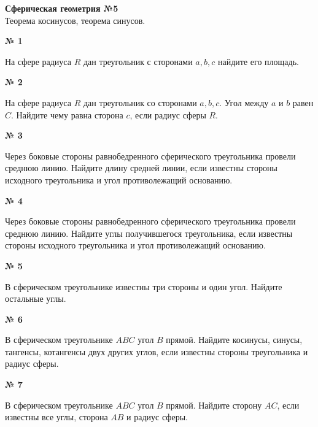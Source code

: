 


    \begin{center}
        \textbf{Сферическая геометрия №5}\\
        Теорема косинусов, теорема синусов.
    \end{center}

    \begin{center}
        \textbf{№ 1}
    \end{center}

    На сфере радиуса $R$ дан треугольник с сторонами $a, b, c$ найдите его площадь.

    \begin{center}
        \textbf{№ 2}
    \end{center}

    На сфере радиуса $R$ дан треугольник со сторонами $a, b, c$.
    Угол между $a$ и $b$ равен $C$.
    Найдите чему равна сторона $c$, если радиус сферы $R$.

    \begin{center}
        \textbf{№ 3}
    \end{center}

    Через боковые стороны равнобедренного сферического треугольника провели среднюю линию.
    Найдите длину средней линии, если известны стороны исходного треугольника и угол противолежащий основанию.


    \begin{center}
        \textbf{№ 4}
    \end{center}

    Через боковые стороны равнобедренного сферического треугольника провели среднюю линию.
    Найдите углы получившегося треугольника, если известны стороны исходного треугольника и угол противолежащий основанию.

    \begin{center}
        \textbf{№ 5}
    \end{center}

    В сферическом треугольнике известны три стороны и один угол.
    Найдите остальные углы.

    \begin{center}
        \textbf{№ 6}
    \end{center}

    В сферическом треугольнике $ABC$ угол $B$ прямой.
    Найдите косинусы, синусы, тангенсы, котангенсы двух других углов,
    если известны стороны треугольника и радиус сферы.

    \begin{center}
        \textbf{№ 7}
    \end{center}

    В сферическом треугольнике $ABC$ угол $B$ прямой.
    Найдите сторону $AC$, если известны все углы, сторона $AB$ и радиус сферы.



